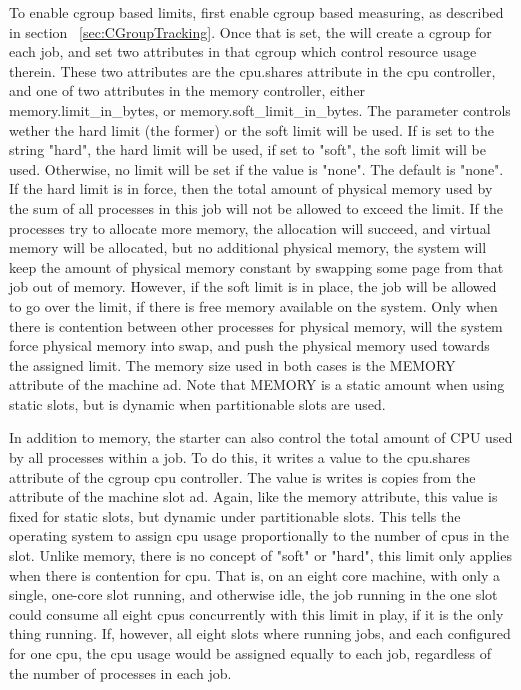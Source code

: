 To enable cgroup based limits, first enable cgroup based measuring, as
described in section ~\ref{sec:CGroupTracking}.  Once that is set,
the  will create a cgroup for each job, and set two
attributes in that cgroup which control resource usage therein.  These
two attributes are the cpu.shares attribute in the cpu controller, and one
of two attributes in the memory controller, either memory.limit\_in\_bytes, or 
memory.soft\_limit\_in\_bytes.  The parameter  controls
wether the hard limit (the former) or the soft limit will be used.  If
 is set to the string "hard", the hard limit will be
used, if set to "soft", the soft limit will be used.  Otherwise, no
limit will be set if the value is "none".  The default is "none".  If
the hard limit is in force, then the total amount of physical memory
used by the sum of all processes in this job will not be allowed to exceed
the limit.  If the processes try to allocate more memory, the allocation will
succeed, and virtual memory will be allocated, but no additional physical memory,
the system will keep the amount of physical memory constant by swapping some
page from that job out of memory.  However, if the soft limit is in place,
the job will be allowed to go over the limit, if there is free memory 
available on the system.  Only when there is contention between other processes for physical memory, will the system force physical memory into swap, and push
the physical memory used towards the assigned limit.  The memory size used in both cases is the MEMORY attribute of the machine ad.  Note that MEMORY is 
a static amount when using static slots, but is dynamic when partitionable 
slots are used.

In addition to memory, the starter can also control the total amount of 
CPU used by all processes within a job.  To do this, it writes a value
to the cpu.shares attribute of the cgroup cpu controller.  The value
is writes is copies from the  attribute of the machine slot
ad.  Again, like the memory attribute, this value is fixed for static slots,
but dynamic under partitionable slots.  This tells the operating system
to assign cpu usage proportionally to the number of cpus in the slot.  Unlike
memory, there is no concept of "soft" or "hard", this limit only applies when
there is contention for cpu.  That is, on an eight core machine, with
only a single, one-core slot running, and otherwise idle, the job running
in the one slot could consume all eight cpus concurrently with this limit
in play, if it is the only thing running.  If, however, all eight slots where
running jobs, and each configured for one cpu, the cpu usage would be assigned
equally to each job, regardless of the number of processes in each job.


